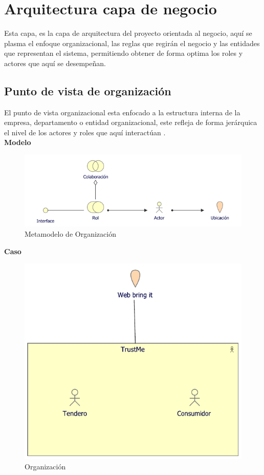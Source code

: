 \section{Arquitectura capa de negocio}
{Esta capa, es la capa de arquitectura del proyecto orientada al negocio, aquí se plasma el enfoque organizacional, las reglas que regirán el negocio y las entidades que representan el sistema, permitiendo obtener de forma optima los roles y actores que aquí se desempeñan.}

	\subsection{Punto de vista de organización}
	{ El punto de vista organizacional esta enfocado a la estructura interna de la empresa, departamento o entidad organizacional, este refleja de forma jerárquica el nivel de los actores y roles que aquí interactúan \cite{archimate}.\\
		
		\textbf{Modelo}\\
		\begin{figure}[H]
			\centering
			\includegraphics[width=0.8\linewidth]{development/organizacion.png}
			\caption{Metamodelo de Organización}
		\end{figure}
	
		\textbf{Caso}\\
		
		\begin{figure}[H]
			\centering
			\includegraphics[width=0.8\linewidth]{development/negocio.pdf}
			\caption{Organización}
		\end{figure}
	}
	
